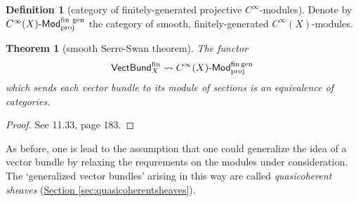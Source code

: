 \documentclass[a4paper,10pt]{scrreprt}
\def\mhyp{{\hbox{-}}}
\theoremstyle{definition}
\newtheorem{definition}{Definition}[section]
\theoremstyle{plain}
\newtheorem{theorem}{Theorem}[section]
\theoremstyle{remark}
\begin{document}
\begin{definition}[category of finitely-generated projective $C^{\infty}$-modules]
  \label{def:categoryofyaddayaddasmoothmodules}
  Denote by $C^{\infty}(X)\mhyp\mathsf{Mod}_{\mathrm{proj}}^{\mathrm{fin\ gen}}$ the category of smooth, finitely-generated $C^{\infty}(X)$-modules.
\end{definition}

\begin{theorem}[smooth Serre-Swan theorem]
  The functor 
  \begin{equation*}
    \mathsf{VectBund}^{\mathrm{fin}}_{X} \rightsquigarrow C^{\infty}(X)\mhyp\mathsf{Mod}^{\mathrm{fin\,gen}}_{\mathrm{proj}}
  \end{equation*}
  which sends each vector bundle to its module of sections is an equivalence of categories.
\end{theorem}
\begin{proof}
  See \cite{nestruev-smooth-manifolds-observables} 11.33, page 183.
\end{proof}

As before, one is lead to the assumption that one could generalize the idea of a vector bundle by relaxing the requrements on the modules under consideration. The `generalized vector bundles' arising in this way are called \emph{quasicoherent sheaves} (\hyperref[sec:quasicoherentsheaves]{Section \ref*{sec:quasicoherentsheaves}}).
\end{document}
